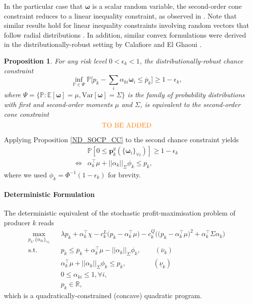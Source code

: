 \documentclass{article}
\newtheorem{proposition}{Proposition}
\begin{document}
In the particular case that $\boldsymbol{\omega}$ is a scalar random variable, the second-order cone constraint reduces to a linear inequality constraint, as observed in \cite{Dvorkin2020}. Note that similar results hold for linear inequality constraints involving random vectors that follow radial distributions \cite{Calafiore2006}. In addition, similar convex formulations were derived in the distributionally-robust setting by Calafiore and El Ghaoui \cite{Calafiore2006}.

\begin{proposition}\label{DR_SOCP_CC}
For any risk level $0 < \epsilon_k < 1$, the distributionally-robust chance constraint
\begin{equation*}
\inf_{\mathbb{P} \in \Psi} \mathbb{P}\Big[p_k - \sum_i \alpha_{ki} \boldsymbol{\omega}_i \le \overline{p}_k\Big] \ge 1 - \epsilon_k,
\end{equation*}
where $\Psi = \{\mathbb{P}: \mathbb{E}[\boldsymbol{\omega}] = \mu, \mbox{Var}[\boldsymbol{\omega}] = \Sigma\}$ is the family of probability distributions with first and second-order moments $\mu$ and $\Sigma$, is equivalent to the second-order cone constraint
\begin{equation*}
\mbox{\textcolor{orange}{TO BE ADDED}}
\end{equation*}
\end{proposition}

Applying Proposition \ref{ND_SOCP_CC} to the second chance constraint yields
\begin{align*}
&\mathbb{P}[0 \le \mathbf{p}_k^g(\{\boldsymbol{\omega}_i\}_{\forall i})] \ge 1 - \epsilon_k\\
\Leftrightarrow & \alpha_k^\top \mu + ||\alpha_k||_{\Sigma} \phi_k \le p_k,
\end{align*}
where we used $\phi_k = \Phi^{-1}(1 - \epsilon_k)$ for brevity. 

\paragraph{Deterministic Formulation} The deterministic equivalent of the stochastic profit-maximisation problem of producer $k$ reads
\begin{align}
\underset{p_k, \{\alpha_{ki}\}_{\forall i}}{\max} \hspace{10pt} & \lambda p_k + \alpha_k^\top \chi - c_k^L\big(p_k - \alpha_k^\top \mu\big) - c_k^Q \Big(\big(p_k - \alpha_{k}^\top \mu \big)^2 + \alpha_k^\top \Sigma \alpha_k\Big)\\
\mbox{s.t. } & p_k \le \overline{p}_k + \alpha_k^\top \mu - ||\alpha_k||_{\Sigma} \phi_k, \hspace{25pt} (\overline{\nu}_k)\\
& \alpha_k^\top \mu + ||\alpha_k||_{\Sigma} \phi_k \le p_k, \hspace{48pt}(\underline{\nu}_k)\\
& 0 \le \alpha_{ki} \le 1, \forall i,\\
&p_k \in \mathbb{R},
\end{align}
which is a quadratically-constrained (concave) quadratic program.
\end{document}
